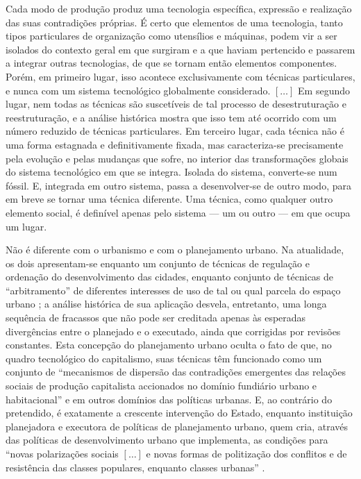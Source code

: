 \begin{citacao}
Cada modo de produção produz uma tecnologia específica, expressão e realização das suas contradições próprias. É certo que elementos de uma tecnologia, tanto tipos particulares de organização como utensílios e máquinas, podem vir a ser isolados do contexto geral em que surgiram e a que haviam pertencido e passarem a integrar outras tecnologias, de que se tornam então elementos componentes. Porém, em primeiro lugar, isso acontece exclusivamente com técnicas particulares, e nunca com um sistema tecnológico globalmente considerado. \([\dots]\) Em segundo lugar, nem todas as técnicas são suscetíveis de tal processo de desestruturação e reestruturação, e a análise histórica mostra que isso tem até ocorrido com um número reduzido de técnicas particulares. Em terceiro lugar, cada técnica não é uma forma estagnada e definitivamente fixada, mas caracteriza-se precisamente pela evolução e pelas mudanças que sofre, no interior das transformações globais do sistema tecnológico em que se integra. Isolada do sistema, converte-se num fóssil. E, integrada em outro sistema, passa a desenvolver-se de outro modo, para em breve se tornar uma técnica diferente. Uma técnica, como qualquer outro elemento social, é definível apenas pelo sistema --- um ou outro --- em que ocupa um lugar. \cite[p.~312]{BERNARDO1991}
\end{citacao}

Não é diferente com o urbanismo e com o planejamento urbano. Na atualidade, os dois apresentam-se enquanto um conjunto de técnicas de regulação e ordenação do desenvolvimento das cidades, enquanto conjunto de técnicas de ``arbitramento'' de diferentes interesses de uso de tal ou qual parcela do espaço urbano \cite{bernardi_organizacao_2007, campbell_intro_2003, duarte_planejamento_2007, fainstein_intro_2002}; a análise histórica de sua aplicação desvela, entretanto, uma longa sequência de fracassos \cite{hall_cidades_2007, SANTOS1982} que não pode ser creditada apenas às esperadas divergências entre o planejado e o executado, ainda que corrigidas por revisões constantes. Esta concepção do planejamento urbano oculta o fato de que, no quadro tecnológico do capitalismo, suas técnicas têm funcionado como um conjunto de ``mecanismos de dispersão das contradições emergentes das relações sociais de produção capitalista accionados no domínio fundiário urbano e habitacional'' \cite[p.~76]{SANTOS1982} e em outros domínios das políticas urbanas. E, ao contrário do pretendido, é exatamente a crescente intervenção do Estado, enquanto instituição planejadora e executora de políticas de planejamento urbano, quem cria, através das políticas de desenvolvimento urbano que implementa, as condições para ``novas polarizações sociais \([\dots]\) e novas formas de politização dos conflitos e de resistência das classes populares, enquanto classes urbanas'' \cite[p.~76]{SANTOS1982}.

